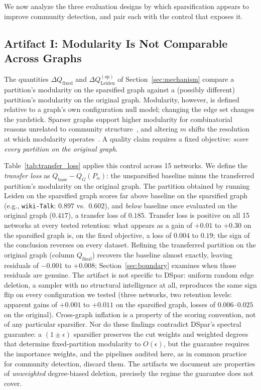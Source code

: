 \documentclass[10pt,journal,compsoc]{IEEEtran}
\begin{document}
We now analyze the three evaluation designs by which sparsification appears to improve community detection, and pair each with the control that exposes it.

\subsection{Artifact I: Modularity Is Not Comparable Across Graphs}
\label{sec:artifact-modularity}

The quantities $\Delta Q_{\mathrm{fixed}}$ and $\Delta Q_{\mathrm{Leiden}}^{\mathrm{(sp)}}$ of Section~\ref{sec:mechanism} compare a partition's modularity on the sparsified graph against a (possibly different) partition's modularity on the original graph.
Modularity, however, is defined relative to a graph's own configuration null model; changing the edge set changes the yardstick.
Sparser graphs support higher modularity for combinatorial reasons unrelated to community structure~\cite{guimera2004modularity}, and altering $m$ shifts the resolution at which modularity operates~\cite{fortunato2007resolution}.
A quality claim requires a fixed objective: \emph{score every partition on the original graph}.



Table~\ref{tab:transfer_loss} applies this control across 15 networks.
We define the \emph{transfer loss} as $Q_{\mathrm{base}} - Q_{G}(P_\alpha)$: the unsparsified baseline minus the transferred partition's modularity on the original graph.
The partition obtained by running Leiden on the sparsified graph scores far above baseline on the sparsified graph (e.g., \texttt{wiki-Talk}: $0.897$ vs.\ $0.602$), and \emph{below} baseline once evaluated on the original graph ($0.417$), a transfer loss of $0.185$.
Transfer loss is positive on all 15 networks at every tested retention: what appears as a gain of $+0.01$ to $+0.30$ on the sparsified graph is, on the fixed objective, a loss of $0.004$ to $0.19$; the sign of the conclusion reverses on every dataset.
Refining the transferred partition on the original graph (column $Q_{\mathrm{final}}$) recovers the baseline almost exactly, leaving residuals of $-0.001$ to $+0.008$; Section~\ref{sec:boundary} examines when those residuals are genuine.
The artifact is not specific to DSpar: uniform random edge deletion, a sampler with no structural intelligence at all, reproduces the same sign flip on every configuration we tested (three networks, two retention levels: apparent gains of $+0.001$ to $+0.011$ on the sparsified graph, losses of $0.006$--$0.025$ on the original). Cross-graph inflation is a property of the scoring convention, not of any particular sparsifier.
Nor do these findings contradict DSpar's spectral guarantee: a $(1 \pm \epsilon)$ sparsifier preserves the cut weights and weighted degrees that determine fixed-partition modularity to $O(\epsilon)$, but the guarantee requires the importance weights, and the pipelines audited here, as in common practice for community detection, discard them. The artifacts we document are properties of \emph{unweighted} degree-biased deletion, precisely the regime the guarantee does not cover.
\end{document}
